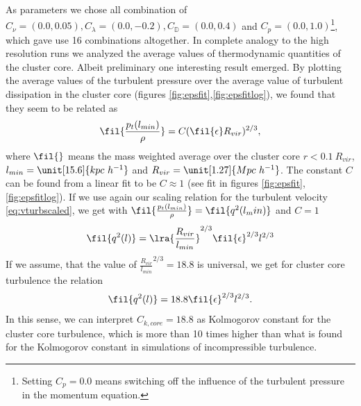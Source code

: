 As parameters we chose all combination of $C_{\nu} = (0.0, 0.05),
C_{\lambda}=(0.0,-0.2),C_{\mathbb{D}}=(0.0,0.4)$ and $C_p =
(0.0,1.0)$\footnote{Setting $C_p=0.0$ means switching off
the influence of the turbulent pressure in the momentum equation.}, which 
gave use 16 combinations altogether. In complete analogy to the high resolution
runs we analyzed the average values of thermodynamic quantities of the cluster
core. Albeit preliminary one interesting result emerged. By plotting the 
average values of the turbulent pressure over the average value of turbulent
dissipation in the cluster core (figures \ref{fig:epsfit},\ref{fig:epsfitlog}),
we found that they seem to be related as
\begin{align}
\fil{\frac{p_t(l_{min})}{\rho}} = 
C (\fil{\epsilon} R_{vir})^{2/3},\label{eq:turbeos}
\end{align}
where $\fil{}$ means the mass weighted average over the cluster core
$r<0.1\ R_{vir} $, $l_{min}=\unit[15.6]{kpc\ h^{-1}}$ and $R_{vir} =
\unit[1.27]{Mpc\ h^{-1}}$. The constant $C$ can be found
from a linear fit to be $C \approx 1$ (see fit in figures
\ref{fig:epsfit},\ref{fig:epsfitlog}).
If we use again our scaling relation for the
turbulent velocity \eqref{eq:vturbscaled}, we get with
$\fil{\frac{p_t(l_{min})}{\rho}} = \fil{q^2(l_min)}$ and $C=1$
\begin{align}
\fil{q^2(l)} = \lra{\frac{R_{vir}}{l_{min}}}^{2/3} \fil{\epsilon}^{2/3} l^{2/3}
\end{align}
If we assume, that the value of $\frac{R_{vir}}{l_{min}}^{2/3} = 18.8$ is
universal, we get for cluster core turbulence the relation
\begin{align}
\fil{q^2(l)} = 18.8 \fil{\epsilon}^{2/3} l^{2/3}.
\end{align}
In this sense, we can interpret $C_{k,core}=18.8$ as Kolmogorov constant for
the cluster core turbulence, which is more than 10 times higher than what is
found for the Kolmogorov constant in simulations of incompressible turbulence.


